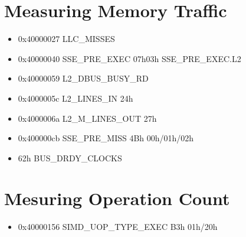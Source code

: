 \documentclass[a4paper,12pt]{article}
\begin{document}
\section{Measuring Memory Traffic}
\begin{itemize}
\item 0x40000027   LLC\_MISSES
\item 0x40000040   SSE\_PRE\_EXEC 07h03h SSE\_PRE\_EXEC.L2
\item 0x40000059   L2\_DBUS\_BUSY\_RD
\item 0x4000005c   L2\_LINES\_IN  24h
\item 0x4000006a   L2\_M\_LINES\_OUT  27h
\item 0x400000cb   SSE\_PRE\_MISS 4Bh 00h/01h/02h
\item 62h BUS\_DRDY\_CLOCKS
\end{itemize}


\section{Mesuring Operation Count}
\begin{itemize}
\item 0x40000156   SIMD\_UOP\_TYPE\_EXEC B3h 01h/20h
\end{itemize}




\listoffigures




\end{document}
